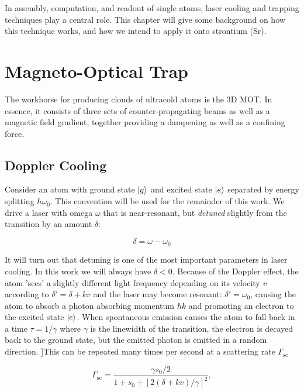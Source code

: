 In assembly, computation, and readout of single atoms, laser cooling and trapping techniques play a central role. 
This chapter will give some background on how this technique works, and how we intend to apply it onto strontium (Sr).

\section{Magneto-Optical Trap}

The workhorse for producing clouds of ultracold atoms is the 3D \ac{MOT}. 
In essence, it consists of three sets of counter-propagating beams as well as a magnetic field gradient, together providing a dampening as well as a confining force. 

\subsection{Doppler Cooling}

Consider an atom with ground state $\lvert g\rangle$ and excited state $\lvert e\rangle$ separated by energy splitting $\hbar \omega_0$.
This convention will be used for the remainder of this work.
We drive a laser with omega $\omega$ that is near-resonant, but \emph{detuned} slightly from the transition by an amount $\delta$:

\begin{equation}\label{detuning}
	\delta = \omega - \omega_0
\end{equation}

It will turn out that detuning is one of the most important parameters in laser cooling. 
In this work we will always have $\delta <0$. Because of the Doppler effect, the atom 'sees' a slightly different light frequency depending on its velocity $v$ according to $\delta'=\delta+kv$ and the laser may become resonant: $\delta' = \omega_0$, causing the atom to absorb a photon absorbing momentum $\hbar k$ and promoting an electron to the excited state $\lvert e\rangle$.
When spontaneous emission causes the atom to fall back in a time $\tau = 1/\gamma$ where $\gamma$ is the linewidth of the transition, the electron is decayed back to the ground state, but the emitted photon is emitted in a random direction. 
]This can be repeated many times per second at a scattering rate $\Gamma_{\text{sc}}$ \cite{Metcalf1999}

\begin{equation}\label{eq:ScatteringFrequency}
	\Gamma_{\text{sc}} = \frac{ \gamma s_0 /2}{1+s_0+\left[2(\delta+ k v)/\gamma\right]^2},
\end{equation}

